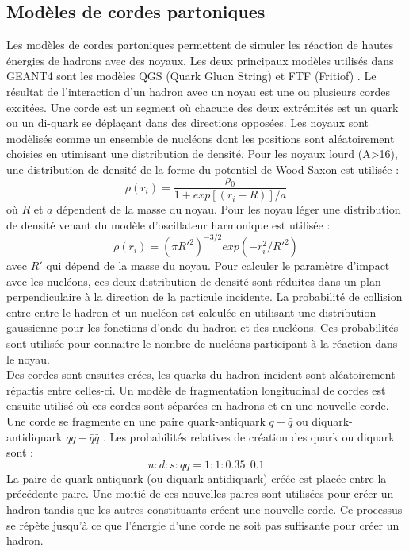 \subsection{Modèles de cordes partoniques}
\label{sec.parton}
Les modèles de cordes partoniques permettent de simuler les réaction de hautes énergies de hadrons avec des noyaux. Les deux principaux modèles utilisés dans GEANT4 sont les modèles QGS (Quark Gluon String) et FTF (Fritiof) \cite{geant4_parton}. Le résultat de l'interaction d'un hadron avec un noyau est une ou plusieurs cordes excitées. Une corde est un segment où chacune des deux extrémités est un quark ou un di-quark se déplaçant dans des directions opposées. Les noyaux sont modèlisés comme un ensemble de nucléons dont les positions sont aléatoirement choisies en utimisant une distribution de densité. Pour les noyaux lourd (A>16), une distribution de densité de la forme du potentiel de Wood-Saxon est utilisée : 
\begin{equation}
  \rho(r_i)=\frac{\rho_0}{1+exp[(r_i-R)]/a}
\end{equation}
où $R$ et $a$ dépendent de la masse du noyau. Pour les noyau léger une distribution de densité venant du modèle d'oscillateur harmonique est utilisée : 
\begin{equation}
  \rho(r_i)=(\pi R'^2)^{-3/2}exp(-r_i^2/R'^2)
\end{equation}
avec $R'$  qui dépend de la masse du noyau.
Pour calculer le paramètre d'impact avec les nucléons, ces deux distribution de densité sont réduites dans un plan perpendiculaire à la direction de la particule incidente. La probabilité de collision entre entre le hadron et un nucléon est calculée en utilisant une distribution gaussienne pour les fonctions d'onde du hadron et des nucléons. Ces probabilités sont utilisée pour connaitre le nombre de nucléons participant à la réaction dans le noyau.\\
Des cordes sont ensuites crées, les quarks du hadron incident sont aléatoirement répartis entre celles-ci. Un modèle de fragmentation longitudinal de cordes est ensuite utilisé où ces cordes sont séparées en hadrons et en une nouvelle corde. Une corde se fragmente en une paire quark-antiquark $q-\bar q$ ou diquark-antidiquark $qq-\bar q \bar q$ \cite{geant4_reference}. Les probabilités relatives de création des quark ou diquark sont :
\begin{equation}
  u:d:s:qq = 1:1:0.35:0.1
\end{equation}
La paire de quark-antiquark (ou diquark-antidiquark) créée est placée entre la précédente paire. Une moitié de ces nouvelles paires sont utilisées pour créer un hadron tandis que les autres constituants créent une nouvelle corde. Ce processus se répète jusqu'à ce que l'énergie d'une corde ne soit pas suffisante pour créer un hadron.\\
